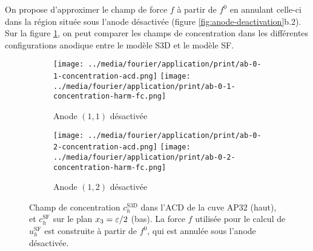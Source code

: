 On propose d'approximer le champ de force $f$ à partir de $f^0$ en
annulant celle-ci dans la région située sous l'anode désactivée
(figure \ref{fig:anode-deactivation}b.2). Sur la figure
\ref{fig:harmonic-concentration-comp-fc}, on peut comparer les champs
de concentration dans les différentes configurations anodique entre le
modèle S3D et le modèle SF.


\begin{figure}[h!]
  \begin{center}
    \begin{subfigure}[t]{\textwidth}
      \texttt{[image: ../media/fourier/application/print/ab-0-1-concentration-acd.png]}
      \texttt{[image: ../media/fourier/application/print/ab-0-1-concentration-harm-fc.png]}
      \caption{Anode $(1,1)$ désactivée}
    \end{subfigure}

    \begin{subfigure}[t]{\textwidth}
      \texttt{[image: ../media/fourier/application/print/ab-0-2-concentration-acd.png]}
      \texttt{[image: ../media/fourier/application/print/ab-0-2-concentration-harm-fc.png]}
      \caption{Anode $(1,2)$ désactivée}
    \end{subfigure}


    \caption{Champ de concentration $c_h^\mathrm{S3D}$ dans l'ACD de
      la cuve AP32 (haut), et $c_h^\mathrm{SF}$ sur le plan
      $x_3 = \varepsilon / 2$ (bas). La force $f$ utilisée
      pour le calcul de $u_h^\mathrm{SF}$  est construite à
      partir de $f^0$, qui est annulée sous l'anode désactivée.}

    \label{fig:harmonic-concentration-comp-fc}
  \end{center}
\end{figure}

